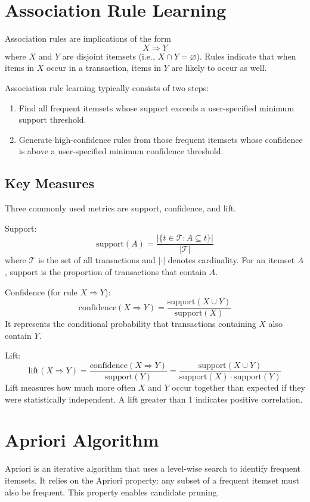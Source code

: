 \documentclass[12pt,a4paper]{report}
\begin{document}
\section{Association Rule Learning}
Association rules are implications of the form
\[
X \Rightarrow Y
\]
where \(X\) and \(Y\) are disjoint itemsets (i.e., \(X \cap Y = \varnothing\)). Rules indicate that when items in \(X\) occur in a transaction, items in \(Y\) are likely to occur as well.

Association rule learning typically consists of two steps:
\begin{enumerate}[nosep]
  \item Find all frequent itemsets whose support exceeds a user-specified minimum support threshold.
  \item Generate high-confidence rules from those frequent itemsets whose confidence is above a user-specified minimum confidence threshold.
\end{enumerate}

\subsection{Key Measures}
Three commonly used metrics are support, confidence, and lift.

Support:
\[
\text{support}(A) = \frac{|\{t \in \mathcal{T} : A \subseteq t\}|}{|\mathcal{T}|}
\]
where \(\mathcal{T}\) is the set of all transactions and \(|\cdot|\) denotes cardinality. For an itemset \(A\), support is the proportion of transactions that contain \(A\).

Confidence (for rule \(X \Rightarrow Y\)):
\[
\text{confidence}(X \Rightarrow Y) = \frac{\text{support}(X \cup Y)}{\text{support}(X)}
\]
It represents the conditional probability that transactions containing \(X\) also contain \(Y\).

Lift:
\[
\text{lift}(X \Rightarrow Y) = \frac{\text{confidence}(X \Rightarrow Y)}{\text{support}(Y)} = \frac{\text{support}(X \cup Y)}{\text{support}(X)\cdot \text{support}(Y)}
\]
Lift measures how much more often \(X\) and \(Y\) occur together than expected if they were statistically independent. A lift greater than 1 indicates positive correlation.

\section{Apriori Algorithm}
Apriori is an iterative algorithm that uses a level-wise search to identify frequent itemsets. It relies on the Apriori property: any subset of a frequent itemset must also be frequent. This property enables candidate pruning.
\end{document}
